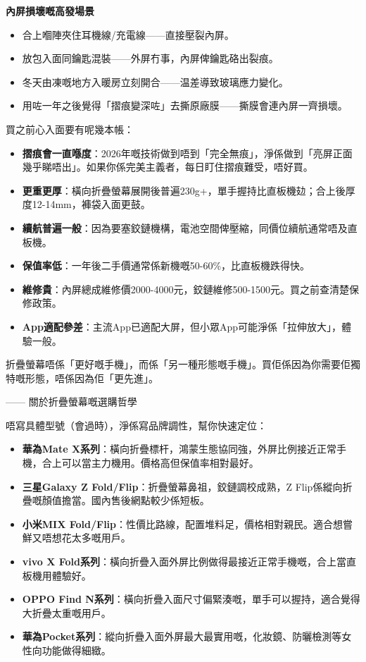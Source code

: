 \textbf{內屏損壞嘅高發場景}\par

\begin{itemize}
  \item 合上嗰陣夾住耳機線/充電線——直接壓裂內屏。
  \item 放包入面同鑰匙混裝——外屏冇事，內屏俾鑰匙硌出裂痕。
  \item 冬天由凍嘅地方入暖房立刻開合——温差導致玻璃應力變化。
  \item 用咗一年之後覺得「摺痕變深咗」去撕原廠膜——撕膜會連內屏一齊損壞。
\end{itemize}


買之前心入面要有呢幾本帳：

\begin{itemize}
  \item \textbf{摺痕會一直喺度}：2026年嘅技術做到唔到「完全無痕」，淨係做到「亮屏正面幾乎睇唔出」。如果你係完美主義者，每日盯住摺痕難受，唔好買。
  \item \textbf{更重更厚}：橫向折疊螢幕展開後普遍230g+，單手握持比直板機攰；合上後厚度12-14mm，褲袋入面更鼓。
  \item \textbf{續航普遍一般}：因為要塞鉸鏈機構，電池空間俾壓縮，同價位續航通常唔及直板機。
  \item \textbf{保值率低}：一年後二手價通常係新機嘅50-60\%，比直板機跌得快。
  \item \textbf{維修貴}：內屏總成維修價2000-4000元，鉸鏈維修500-1500元。買之前查清楚保修政策。
  \item \textbf{App適配參差}：主流App已適配大屏，但小眾App可能淨係「拉伸放大」，體驗一般。
\end{itemize}

折疊螢幕唔係「更好嘅手機」，而係「另一種形態嘅手機」。買佢係因為你需要佢獨特嘅形態，唔係因為佢「更先進」。

—— 關於折疊螢幕嘅選購哲學


唔寫具體型號（會過時），淨係寫品牌調性，幫你快速定位：

\begin{itemize}
  \item \textbf{華為Mate X系列}：橫向折疊標杆，鴻蒙生態協同強，外屏比例接近正常手機，合上可以當主力機用。價格高但保值率相對最好。
  \item \textbf{三星Galaxy Z Fold/Flip}：折疊螢幕鼻祖，鉸鏈調校成熟，Z Flip係縱向折疊嘅顏值擔當。國內售後網點較少係短板。
  \item \textbf{小米MIX Fold/Flip}：性價比路線，配置堆料足，價格相對親民。適合想嘗鮮又唔想花太多嘅用戶。
  \item \textbf{vivo X Fold系列}：橫向折疊入面外屏比例做得最接近正常手機嘅，合上當直板機用體驗好。
  \item \textbf{OPPO Find N系列}：橫向折疊入面尺寸偏緊湊嘅，單手可以握持，適合覺得大折疊太重嘅用戶。
  \item \textbf{華為Pocket系列}：縱向折疊入面外屏最大最實用嘅，化妝鏡、防曬檢測等女性向功能做得細緻。
\end{itemize}

